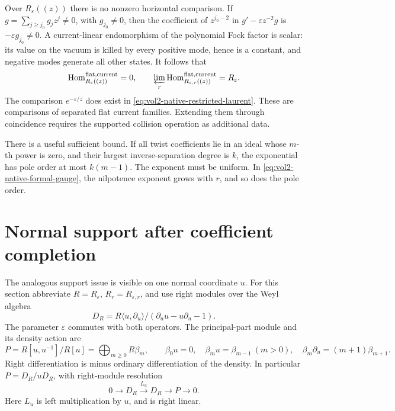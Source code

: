 Over \(R_\varepsilon((z))\) there is no nonzero horizontal comparison.
If \(g=\sum_{j\geq j_0}g_jz^j\ne0\), with \(g_{j_0}\ne0\), then
the coefficient of \(z^{j_0-2}\) in
\(g'-\varepsilon z^{-2}g\) is
\(-\varepsilon g_{j_0}\ne0\).
A current-linear endomorphism of the polynomial Fock factor is scalar:
its value on the vacuum is killed by every positive mode, hence is a
constant, and negative modes generate all other states. It follows that
\[
 \operatorname{Hom}^{\mathrm{flat,current}}_{R_\varepsilon((z))}=0,
 \qquad
 \varprojlim_r
 \operatorname{Hom}^{\mathrm{flat,current}}_{R_{\varepsilon,r}((z))}
       =R_\varepsilon.
\]
The comparison \(e^{-\varepsilon/z}\) does exist in
\eqref{eq:vol2-native-restricted-laurent}. These are comparisons of
separated flat current families. Extending them through coincidence
requires the supported collision operation as additional data.

There is a useful sufficient bound. If all twist coefficients lie in
an ideal whose \(m\)-th power is zero, and their largest inverse-separation
degree is \(k\), the exponential has pole order at most \(k(m-1)\).
The exponent must be uniform. In \eqref{eq:vol2-native-formal-gauge},
the nilpotence exponent grows with \(r\), and so does the pole order.

\section{Normal support after coefficient completion}

The analogous support issue is visible on one normal coordinate \(u\).
For this section abbreviate \(R=R_\varepsilon\), \(R_r=R_{\varepsilon,r}\),
and use right modules over the Weyl algebra
\[
 D_R=R\langle u,\partial_u\rangle/
                  (\partial_u u-u\partial_u-1).
\]
The parameter \(\varepsilon\) commutes with both operators.
The principal-part module and its density action are
\begin{equation}\label{eq:vol2-native-normal-principal-parts}
 P=R[u,u^{-1}]/R[u]=\bigoplus_{m\geq0}R\beta_m,
 \qquad
 \beta_0u=0,\quad \beta_mu=\beta_{m-1}\ (m>0),\quad
 \beta_m\partial_u=(m+1)\beta_{m+1}.
\end{equation}
Right differentiation is minus ordinary differentiation of the density.
In particular \(P=D_R/uD_R\), with right-module resolution
\[
             0\longrightarrow D_R\xrightarrow{L_u}D_R
                     \longrightarrow P\longrightarrow0.
\]
Here \(L_u\) is left multiplication by \(u\), and is right linear.

